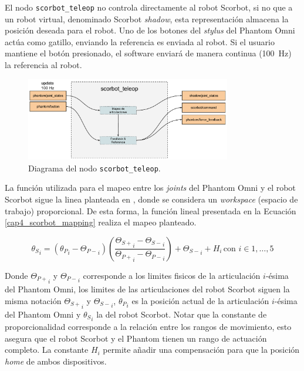 El nodo \texttt{scorbot\_teleop} no controla directamente al robot Scorbot, si no que a un robot virtual, denominado Scorbot \textit{shadow}, esta representación almacena la posición deseada para el robot. Uno de los botones del \textit{stylus} del Phantom Omni actúa como gatillo, enviando la referencia es enviada al robot. Si el usuario mantiene el botón presionado, el software enviará de manera continua (\SI{100}{\hertz}) la referencia al robot.

\begin{figure}[H]
  \centering
  \includegraphics[width=0.8\textwidth]{img/cap4/scorbot_teleop.pdf}
  \caption{Diagrama del nodo \texttt{scorbot\_teleop}.}
  \label{cap4_scorbot_teleop}
\end{figure}

La función utilizada para el mapeo entre los \textit{joints} del Phantom Omni y el robot Scorbot sigue la linea planteada en \cite{david}, donde se considera un \textit{workspace} (espacio de trabajo) proporcional. De esta forma, la función lineal presentada en la Ecuación \ref{cap4_scorbot_mapping} realiza el mapeo planteado.

\begin{equation}\label{cap4_scorbot_mapping}
{\theta_S}_{i} = ({\theta_P}_{i} - {\Theta_{P-}}_{i}) \left(  \frac{{\Theta_{S+}}_{i} - {\Theta_{S-}}_{i}}{{\Theta_{P+}}_{i} - {\Theta_{P-}}_{i}}   \right) + {\Theta_{S-}}_{i} + H_i \, \mbox{con } i \in {1, \dots, 5}
\end{equation}

Donde ${\Theta_{P+}}_i$ y ${\Theta_{P-}}_i$ corresponde a los limites fisicos de la articulación $i$-ésima del Phantom Omni, los limites de las articulaciones del robot Scorbot siguen la misma notación ${\Theta_{S+}}_i$ y ${\Theta_{S-}}_i$, ${\theta_P}_{i}$ es la posición actual de la articulación $i$-ésima del Phantom Omni y ${\theta_S}_{i}$ la del robot Scorbot. Notar que la constante de proporcionalidad corresponde a la relación entre los rangos de movimiento, esto asegura que el robot Scorbot y el Phantom tienen un rango de actuación completo. La constante $H_i$ permite añadir una compensación para que la posición \textit{home} de ambos dispositivos.

